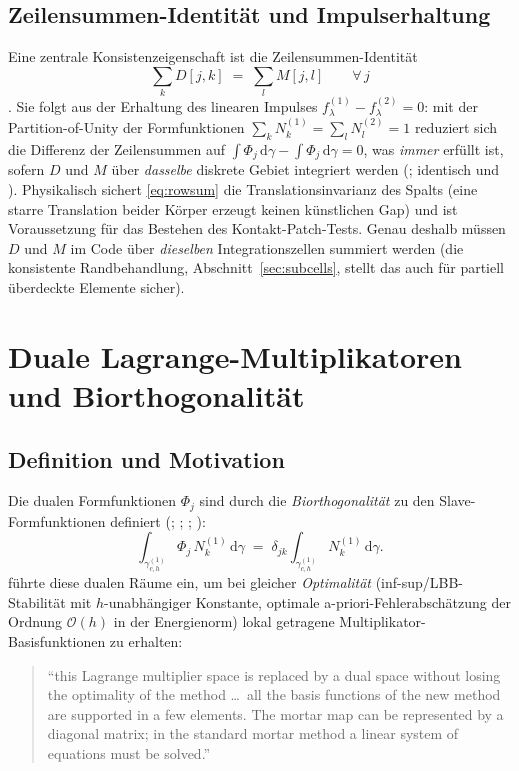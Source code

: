 \documentclass[a4paper,11pt]{article}
\def\bm#1{#1}%
\let\stdsection\section
\renewcommand{\section}{\clearpage\stdsection}
\begin{document}
\subsection{Zeilensummen-Identität und Impulserhaltung}
Eine zentrale Konsistenzeigenschaft ist die Zeilensummen-Identität
\begin{equation}
\sum_k \bm D[j,k] \;=\; \sum_l \bm M[j,l] \qquad \forall\, j
\label{eq:rowsum}
\end{equation}
\citep[Gl.~(4.99)]{farah}. Sie folgt aus der Erhaltung des linearen Impulses
$\bm f_\lambda^{(1)}-\bm f_\lambda^{(2)}=\bm 0$: mit der Partition-of-Unity der Formfunktionen
$\sum_k N_k^{(1)}=\sum_l N_l^{(2)}=1$ \citep[Gl.~(4.97)]{farah} reduziert sich die Differenz der
Zeilensummen auf $\int\Phi_j\,\mathrm d\gamma - \int\Phi_j\,\mathrm d\gamma = 0$, was
\emph{immer} erfüllt ist, sofern $\bm D$ und $\bm M$ über \emph{dasselbe} diskrete Gebiet integriert
werden (\citealp[Gl.~(4.100)--(4.101)]{farah}; identisch \citealt{popp2010} und \citealt{puso2004}). Physikalisch
sichert \eqref{eq:rowsum} die Translationsinvarianz des Spalts (eine starre Translation beider Körper
erzeugt keinen künstlichen Gap) und ist Voraussetzung für das Bestehen des Kontakt-Patch-Tests. Genau
deshalb müssen $\bm D$ und $\bm M$ im Code über \emph{dieselben} Integrationszellen summiert werden
(die konsistente Randbehandlung, Abschnitt~\ref{sec:subcells}, stellt das auch für partiell
überdeckte Elemente sicher).

\section{Duale Lagrange-Multiplikatoren und Biorthogonalität}
\label{sec:dual}

\subsection{Definition und Motivation}
Die dualen Formfunktionen $\Phi_j$ sind durch die \emph{Biorthogonalität} zu den
Slave-Formfunktionen definiert (\citealp[Gl.~(3.5)]{wohlmuth2000}; \citealp[Gl.~(4.1)]{popp2012};
\citealp[Gl.~(30)]{poppgeewall2009}; \citealp[Gl.~(3.46)]{farah}):
\begin{equation}
\int_{\gamma_{c,h}^{(1)}} \Phi_j\, N_k^{(1)}\,\mathrm d\gamma
\;=\; \delta_{jk}\int_{\gamma_{c,h}^{(1)}} N_k^{(1)}\,\mathrm d\gamma .
\label{eq:biorth}
\end{equation}
\citet{wohlmuth2000} führte diese dualen Räume ein, um bei gleicher \emph{Optimalität}
(inf-sup/LBB-Stabilität mit $h$-unabhängiger Konstante, optimale a-priori-Fehlerabschätzung der
Ordnung $\mathcal O(h)$ in der Energienorm) lokal getragene Multiplikator-Basisfunktionen zu erhalten:
\begin{quote}
\small ``this Lagrange multiplier space is replaced by a dual space without losing the optimality of
the method \ldots\ all the basis functions of the new method are supported in a few elements. The
mortar map can be represented by a diagonal matrix; in the standard mortar method a linear system of
equations must be solved.'' \hfill \citep[Abstract]{wohlmuth2000}
\end{quote}
\end{document}
